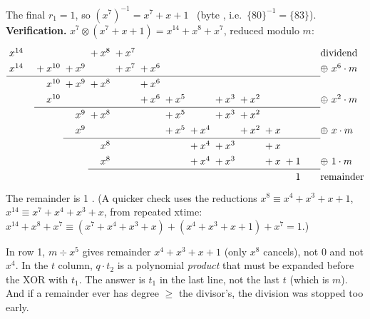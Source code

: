 \begin{worked}
The final $r_1 = 1$, so \quad $\boxed{(x^7)^{-1} = x^7 + x + 1}$ \ (byte , i.e.\ $\{80\}^{-1} = \{83\}$).\\[2pt]
\textbf{Verification.} $x^7 \otimes (x^7 + x + 1) = x^{14} + x^8 + x^7$, reduced modulo $m$:
\[
\renewcommand{\arraystretch}{1.3}\begin{array}{@{}*{15}{@{\;}r}@{\qquad}l@{}}
x^{14} &  &  &  &  &  & {}+x^{8} & {}+x^{7} &  &  &  &  &  &  &  & \text{dividend}\\
x^{14} &  &  &  & {}+x^{10} & {}+x^{9} &  & {}+x^{7} & {}+x^{6} &  &  &  &  &  &  & \oplus\ x^{6}\cdot m\\
\cline{1-15}
 &  &  &  & x^{10} & {}+x^{9} & {}+x^{8} &  & {}+x^{6} &  &  &  &  &  &  & \\
 &  &  &  & x^{10} &  &  &  & {}+x^{6} & {}+x^{5} &  & {}+x^{3} & {}+x^{2} &  &  & \oplus\ x^{2}\cdot m\\
\cline{5-15}
 &  &  &  &  & x^{9} & {}+x^{8} &  &  & {}+x^{5} &  & {}+x^{3} & {}+x^{2} &  &  & \\
 &  &  &  &  & x^{9} &  &  &  & {}+x^{5} & {}+x^{4} &  & {}+x^{2} & {}+x &  & \oplus\ x\cdot m\\
\cline{6-15}
 &  &  &  &  &  & x^{8} &  &  &  & {}+x^{4} & {}+x^{3} &  & {}+x &  & \\
 &  &  &  &  &  & x^{8} &  &  &  & {}+x^{4} & {}+x^{3} &  & {}+x & {}+1 & \oplus\ 1\cdot m\\
\cline{7-15}
 &  &  &  &  &  &  &  &  &  &  &  &  &  & 1  & \text{remainder}\\
\end{array}
\]
The remainder is 1 \checkmark. (A quicker check uses the reductions $x^8 \equiv x^4 + x^3 + x + 1$, $x^{14} \equiv x^7 + x^4 + x^3 + x$, from repeated xtime: $x^{14} + x^8 + x^7 \equiv (x^7 + x^4 + x^3 + x) + (x^4 + x^3 + x + 1) + x^7 = 1$.)
\end{worked}

\begin{trap}
In row 1, $m \div x^5$ gives remainder $x^4 + x^3 + x + 1$ (only $x^8$ cancels), not 0 and not $x^4$. In the $t$ column, $q \cdot t_2$ is a polynomial \emph{product} that must be expanded before the XOR with $t_1$. The answer is $t_1$ in the last line, not the last $t$ (which is $m$). And if a remainder ever has degree $\ge$ the divisor's, the division was stopped too early.
\end{trap}

